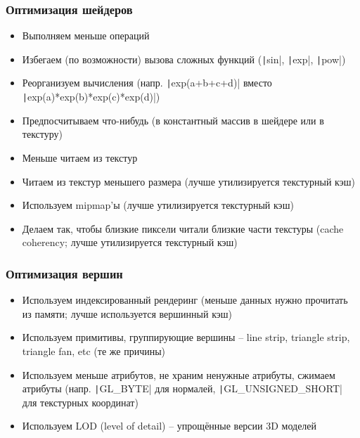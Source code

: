 \documentclass{beamer}
\begin{document}
\begin{frame}[fragile]
\fontsize{10pt}{10pt}
\frametitle{Оптимизация шейдеров}
\begin{itemize}
\item Выполняем меньше операций
\pause
\item Избегаем (по возможности) вызова сложных функций (\texttt|sin|, \texttt|exp|, \texttt|pow|)
\pause
\item Реорганизуем вычисления (напр. \texttt|exp(a+b+c+d)| вместо \texttt|exp(a)*exp(b)*exp(c)*exp(d)|)
\pause
\item Предпосчитываем что-нибудь (в константный массив в шейдере или в текстуру)
\pause
\item Меньше читаем из текстур
\pause
\item Читаем из текстур меньшего размера (лучше утилизируется текстурный кэш)
\pause
\item Используем mipmap'ы (лучше утилизируется текстурный кэш)
\pause
\item Делаем так, чтобы близкие пиксели читали близкие части текстуры (cache coherency; лучше утилизируется текстурный кэш)
\end{itemize}
\end{frame}

\begin{frame}[fragile]
\frametitle{Оптимизация вершин}
\begin{itemize}
\item Используем индексированный рендеринг (меньше данных нужно прочитать из памяти; лучше используется вершинный кэш)
\pause
\item Используем примитивы, группирующие вершины -- line strip, triangle strip, triangle fan, etc (те же причины)
\pause
\item Используем меньше атрибутов, не храним ненужные атрибуты, сжимаем атрибуты (напр. \texttt|GL_BYTE| для нормалей, \texttt|GL_UNSIGNED_SHORT| для текстурных координат)
\pause
\item Используем LOD (level of detail) -- упрощённые версии 3D моделей
\end{itemize}
\end{frame}
\end{document}
